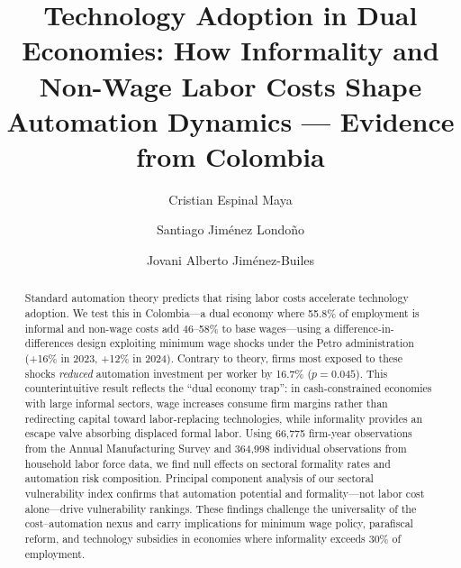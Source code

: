 \documentclass[5p,times,authoryear]{elsarticle}
\begin{document}
\begin{frontmatter}

\title{Technology Adoption in Dual Economies: How Informality and Non-Wage Labor Costs Shape Automation Dynamics --- Evidence from Colombia}

\author[eafit]{Cristian Espinal Maya}

\author[eafit]{Santiago Jim\'enez Londo\~no}

\author[unal]{Jovani Alberto Jim\'enez-Builes}




\begin{abstract}
Standard automation theory predicts that rising labor costs accelerate technology adoption. We test this in Colombia---a dual economy where 55.8\% of employment is informal and non-wage costs add 46--58\% to base wages---using a difference-in-differences design exploiting minimum wage shocks under the Petro administration (+16\% in 2023, +12\% in 2024). Contrary to theory, firms most exposed to these shocks \emph{reduced} automation investment per worker by 16.7\% ($p=0.045$). This counterintuitive result reflects the ``dual economy trap'': in cash-constrained economies with large informal sectors, wage increases consume firm margins rather than redirecting capital toward labor-replacing technologies, while informality provides an escape valve absorbing displaced formal labor. Using 66,775 firm-year observations from the Annual Manufacturing Survey and 364,998 individual observations from household labor force data, we find null effects on sectoral formality rates and automation risk composition. Principal component analysis of our sectoral vulnerability index confirms that automation potential and formality---not labor cost alone---drive vulnerability rankings. These findings challenge the universality of the cost--automation nexus and carry implications for minimum wage policy, parafiscal reform, and technology subsidies in economies where informality exceeds 30\% of employment.
\end{abstract}


\end{frontmatter}
\end{document}
